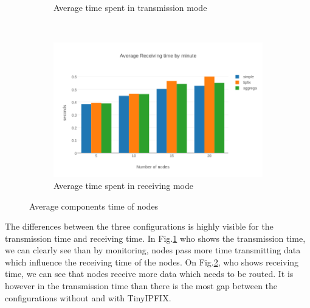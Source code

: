 \begin{figure}[h]
\begin{subfigure}[b]{0.45\textwidth}
        \caption{Average time spent in transmission mode}
        \label{fig:tx_time}
    \end{subfigure}
    ~
    \begin{subfigure}[b]{0.45\textwidth}
        \includegraphics[width=\textwidth]{res/average_rx}
        \caption{Average time spent in receiving mode}
        \label{fig:rx_time}
    \end{subfigure}
    \caption{Average components time of nodes}
    \label{fig:time_all}
\end{figure}

The differences between the three configurations is highly visible for the transmission time and receiving time. In Fig.\ref{fig:tx_time} who shows the transmission time, we can clearly see than by monitoring, nodes pass more time transmitting data which influence the receiving time of the nodes. On Fig.\ref{fig:rx_time}, who shows receiving time, we can see that nodes receive more data which needs to be routed. It is however in the transmission time than there is the most gap between the configurations without and with TinyIPFIX.
